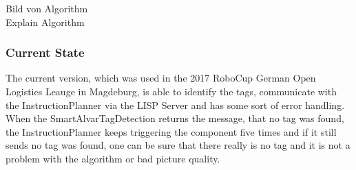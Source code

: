 Bild von Algorithm \\

Explain Algorithm


\subsubsection{Current State}

The current version, which was used in the 2017 RoboCup German Open Logistics Leauge in Magdeburg, is able to identify the tags, communicate with the InstructionPlanner via the LISP Server and has some sort of error handling. When the SmartAlvarTagDetection returns the message, that no tag was found, the InstructionPlanner keeps triggering the component five times and if it still sends no tag was found, one can be sure that there really is no tag and it is not a problem with the algorithm or bad picture quality. 
